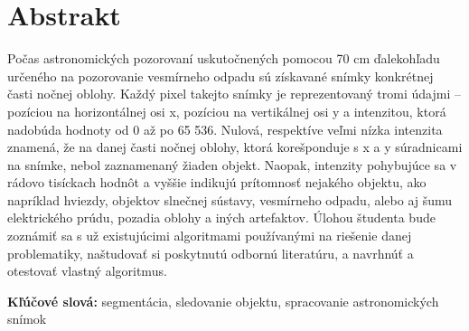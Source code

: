 \chapter*{Abstrakt}\label{chap:abstract_sk}

Počas astronomických pozorovaní uskutočnených pomocou 70 cm
ďalekohľadu určeného na pozorovanie vesmírneho odpadu sú získavané snímky
konkrétnej časti nočnej oblohy. Každý pixel
takejto snímky je reprezentovaný tromi údajmi – pozíciou na horizontálnej osi
x, pozíciou na vertikálnej osi y a intenzitou, ktorá nadobúda hodnoty od 0 až
po 65 536. Nulová, respektíve veľmi
nízka intenzita znamená, že na danej časti nočnej oblohy, ktorá korešponduje
s x a y súradnicami na snímke, nebol zaznamenaný žiaden objekt. Naopak,
intenzity pohybujúce sa v rádovo tisíckach
hodnôt a vyššie indikujú prítomnosť nejakého objektu, ako napríklad hviezdy,
objektov slnečnej
sústavy, vesmírneho odpadu, alebo aj šumu elektrického prúdu, pozadia oblohy
a iných artefaktov.
Úlohou študenta bude zoznámiť sa s už existujúcimi algoritmami používanými
na riešenie
danej problematiky, naštudovať si poskytnutú odbornú literatúru, a navrhnúť
a otestovať vlastný
algoritmus.


\bigskip




\bigskip

\noindent \textbf{Kľúčové slová:} segmentácia, sledovanie objektu, spracovanie astronomických snímok
\vfill\eject 
